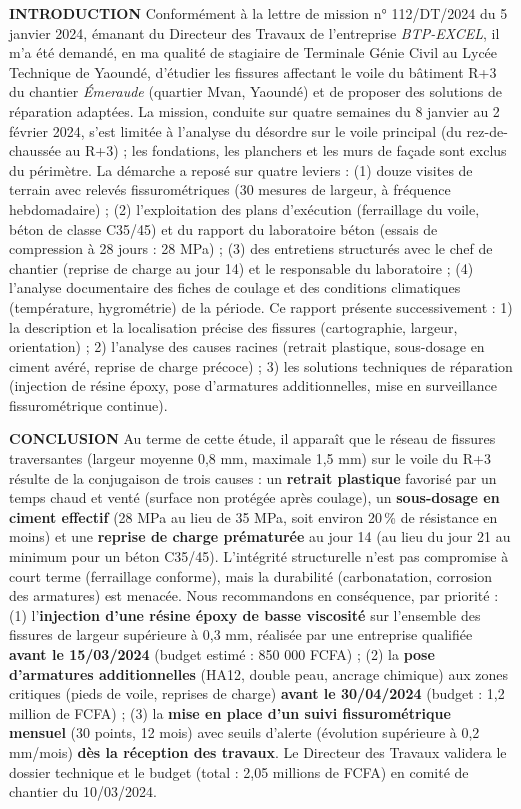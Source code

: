 \documentclass[11pt]{article}
\begin{document}
\begin{corrige}
\textbf{INTRODUCTION}
Conformément à la lettre de mission n° 112/DT/2024 du 5 janvier 2024, émanant du Directeur des Travaux de l'entreprise \emph{BTP-EXCEL}, il m'a été demandé, en ma qualité de stagiaire de Terminale Génie Civil au Lycée Technique de Yaoundé, d'étudier les fissures affectant le voile du bâtiment R+3 du chantier \emph{Émeraude} (quartier Mvan, Yaoundé) et de proposer des solutions de réparation adaptées.
La mission, conduite sur quatre semaines du 8 janvier au 2 février 2024, s'est limitée à l'analyse du désordre sur le voile principal (du rez-de-chaussée au R+3) ; les fondations, les planchers et les murs de façade sont exclus du périmètre.
La démarche a reposé sur quatre leviers : (1) douze visites de terrain avec relevés fissurométriques (30 mesures de largeur, à fréquence hebdomadaire) ; (2) l'exploitation des plans d'exécution (ferraillage du voile, béton de classe C35/45) et du rapport du laboratoire béton (essais de compression à 28 jours : 28 MPa) ; (3) des entretiens structurés avec le chef de chantier (reprise de charge au jour 14) et le responsable du laboratoire ; (4) l'analyse documentaire des fiches de coulage et des conditions climatiques (température, hygrométrie) de la période.
Ce rapport présente successivement : 1) la description et la localisation précise des fissures (cartographie, largeur, orientation) ; 2) l'analyse des causes racines (retrait plastique, sous-dosage en ciment avéré, reprise de charge précoce) ; 3) les solutions techniques de réparation (injection de résine époxy, pose d'armatures additionnelles, mise en surveillance fissurométrique continue).

\textbf{CONCLUSION}
Au terme de cette étude, il apparaît que le réseau de fissures traversantes (largeur moyenne 0,8 mm, maximale 1,5 mm) sur le voile du R+3 résulte de la conjugaison de trois causes : un \textbf{retrait plastique} favorisé par un temps chaud et venté (surface non protégée après coulage), un \textbf{sous-dosage en ciment effectif} (28 MPa au lieu de 35 MPa, soit environ 20\,\% de résistance en moins) et une \textbf{reprise de charge prématurée} au jour 14 (au lieu du jour 21 au minimum pour un béton C35/45). L'intégrité structurelle n'est pas compromise à court terme (ferraillage conforme), mais la durabilité (carbonatation, corrosion des armatures) est menacée.
Nous recommandons en conséquence, par priorité : (1) l'\textbf{injection d'une résine époxy de basse viscosité} sur l'ensemble des fissures de largeur supérieure à 0,3 mm, réalisée par une entreprise qualifiée \textbf{avant le 15/03/2024} (budget estimé : 850 000 FCFA) ; (2) la \textbf{pose d'armatures additionnelles} (HA12, double peau, ancrage chimique) aux zones critiques (pieds de voile, reprises de charge) \textbf{avant le 30/04/2024} (budget : 1,2 million de FCFA) ; (3) la \textbf{mise en place d'un suivi fissurométrique mensuel} (30 points, 12 mois) avec seuils d'alerte (évolution supérieure à 0,2 mm/mois) \textbf{dès la réception des travaux}. Le Directeur des Travaux validera le dossier technique et le budget (total : 2,05 millions de FCFA) en comité de chantier du 10/03/2024.
\end{corrige}
\end{document}
